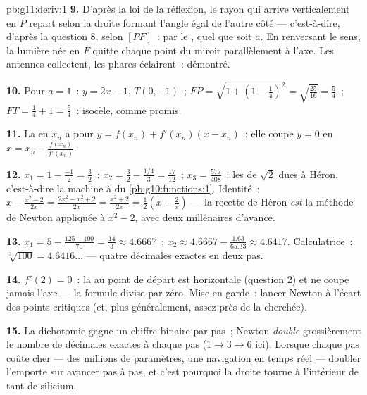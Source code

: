 \begin{solution}{pb:g11:deriv:1}
\textbf{9.} D'après la loi de la réflexion, le rayon qui arrive
verticalement en $P$ repart selon la droite formant l'angle égal de
l'autre côté --- c'est-à-dire, d'après la question 8, selon $[PF]$~:
par le , quel que soit $a$. En renversant le sens, la lumière
née en $F$ quitte chaque point du miroir parallèlement à l'axe. Les
antennes collectent, les phares éclairent~: démontré.

\textbf{10.} Pour $a = 1$~:  $y = 2x - 1$, $T(0, -1)$~;
$FP = \sqrt{1 + \left(1 - \frac14\right)^2} =
\sqrt{\frac{25}{16}} = \frac54$~; $FT = \frac14 + 1 = \frac54$~:
isocèle, comme promis.

\textbf{11.} La  en $x_n$ a pour 
$y = f(x_n) + f'(x_n)(x - x_n)$~; elle coupe $y = 0$ en
$x = x_n - \frac{f(x_n)}{f'(x_n)}$.

\textbf{12.} $x_1 = 1 - \frac{-1}{2} = \frac32$~;
$x_2 = \frac32 - \frac{1/4}{3} = \frac{17}{12}$~;
$x_3 = \frac{577}{408}$~: les  de $\sqrt2$ dues à
Héron, c'est-à-dire la machine à  du
\cref{pb:g10:functions:1}. Identité~:
$x - \frac{x^2 - 2}{2x} = \frac{2x^2 - x^2 + 2}{2x}
= \frac{x^2 + 2}{2x} = \frac12\left(x + \frac2x\right)$ --- la
recette de Héron \emph{est} la méthode de Newton appliquée à
$x^2 - 2$, avec deux millénaires d'avance.

\textbf{13.} $x_1 = 5 - \frac{125 - 100}{75} = \frac{14}{3}
\approx 4.6667$~; $x_2 \approx 4.6667 - \frac{1.63}{65.33}
\approx 4.6417$. Calculatrice~: $\sqrt[3]{100} = 4.6416\ldots$ ---
quatre décimales exactes en deux pas.

\textbf{14.} $f'(2) = 0$~: la  au point de départ est
horizontale (question 2) et ne coupe jamais l'axe --- la formule
divise par zéro. Mise en garde~: lancer Newton à l'écart des points
critiques (et, plus généralement, assez près de la 
cherchée).

\textbf{15.} La dichotomie gagne un chiffre binaire par pas~; Newton
\emph{double} grossièrement le nombre de décimales exactes à chaque
pas ($1 \to 3 \to 6$ ici). Lorsque chaque pas coûte cher --- des
millions de paramètres, une navigation en temps réel --- doubler
l'emporte sur avancer pas à pas, et c'est pourquoi la droite
 tourne à l'intérieur de tant de silicium.


\end{solution}

